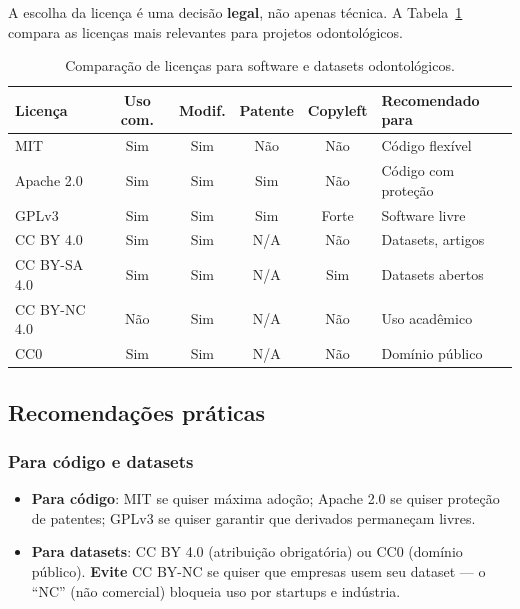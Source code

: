 A escolha da licença é uma decisão \textbf{legal}, não apenas técnica.
A Tabela~\ref{tab:licenses-comparison} compara as licenças mais relevantes
para projetos odontológicos.

\begin{table}[H]
  \centering
  \caption{Comparação de licenças para software e datasets odontológicos.}
  \label{tab:licenses-comparison}
  \begin{tabularx}{\textwidth}{lccccX}
    \toprule
    \textbf{Licença} & \textbf{Uso com.} & \textbf{Modif.} & \textbf{Patente} & \textbf{Copyleft} & \textbf{Recomendado para} \\
    \midrule
    MIT & Sim & Sim & Não & Não & Código flexível \\
    Apache 2.0 & Sim & Sim & Sim & Não & Código com proteção \\
    GPLv3 & Sim & Sim & Sim & Forte & Software livre \\
    CC BY 4.0 & Sim & Sim & N/A & Não & Datasets, artigos \\
    CC BY-SA 4.0 & Sim & Sim & N/A & Sim & Datasets abertos \\
    CC BY-NC 4.0 & Não & Sim & N/A & Não & Uso acadêmico \\
    CC0 & Sim & Sim & N/A & Não & Domínio público \\
    \bottomrule
  \end{tabularx}
\end{table}

    

\subsection{Recomendações práticas}

\subsubsection{Para código e datasets}

\begin{itemize}
  \item \textbf{Para código}: MIT se quiser máxima adoção; Apache 2.0 se
    quiser proteção de patentes; GPLv3 se quiser garantir que derivados
    permaneçam livres.

  \item \textbf{Para datasets}: CC BY 4.0 (atribuição obrigatória) ou
    CC0 (domínio público). \textbf{Evite} CC BY-NC se quiser que empresas
    usem seu dataset — o ``NC'' (não comercial) bloqueia uso por startups
    e indústria.
\end{itemize}

